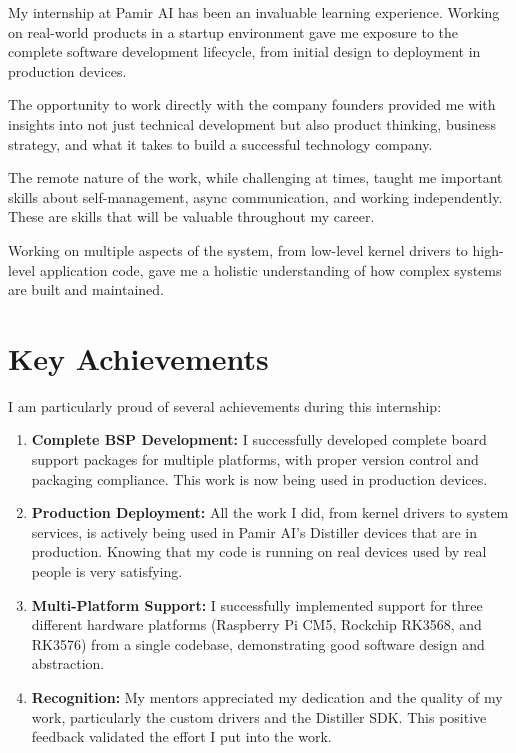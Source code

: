 \documentclass[12pt,a4paper]{report}
\begin{document}
My internship at Pamir AI has been an invaluable learning experience. Working on real-world products in a startup environment gave me exposure to the complete software development lifecycle, from initial design to deployment in production devices.

\vspace{0.3cm}

The opportunity to work directly with the company founders provided me with insights into not just technical development but also product thinking, business strategy, and what it takes to build a successful technology company.

\vspace{0.3cm}

The remote nature of the work, while challenging at times, taught me important skills about self-management, async communication, and working independently. These are skills that will be valuable throughout my career.

\vspace{0.3cm}

Working on multiple aspects of the system, from low-level kernel drivers to high-level application code, gave me a holistic understanding of how complex systems are built and maintained.

\section{Key Achievements}

I am particularly proud of several achievements during this internship:

\begin{enumerate}[itemsep=0.3cm]
    \item \textbf{Complete BSP Development:} I successfully developed complete board support packages for multiple platforms, with proper version control and packaging compliance. This work is now being used in production devices.

    \item \textbf{Production Deployment:} All the work I did, from kernel drivers to system services, is actively being used in Pamir AI's Distiller devices that are in production. Knowing that my code is running on real devices used by real people is very satisfying.

    \item \textbf{Multi-Platform Support:} I successfully implemented support for three different hardware platforms (Raspberry Pi CM5, Rockchip RK3568, and RK3576) from a single codebase, demonstrating good software design and abstraction.

    \item \textbf{Recognition:} My mentors appreciated my dedication and the quality of my work, particularly the custom drivers and the Distiller SDK. This positive feedback validated the effort I put into the work.
\end{enumerate}
\end{document}
